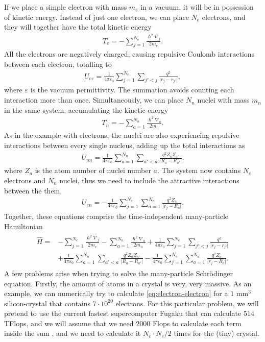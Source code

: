 If we place a simple electron with mass $m_e$ in a vacuum, it will be in  possession of kinetic energy. Instead of just one electron, we can place $N_e$ electrons, and they will together have the total kinetic energy
\begin{align}
  T_e = - \sum_{j=1}^{N_e} \frac{\hslash^2\nabla_j}{2m_e}.
\end{align}
All the electrons are negatively charged, causing repulsive Coulomb interactions between each electron, totalling to
\begin{align}
  U_{ee} = \frac{1}{4\pi\varepsilon_0}\sum_{j=1}^{N_e}\sum_{j'<j} \frac{q^2}{\lvert r_j - r_{j'}\rvert},
  \label{eq:electron-electron}
\end{align}
where $\varepsilon$ is the vacuum permittivity. The summation avoids counting each interaction more than once. Simultaneously, we can place $N_n$ nuclei with mass $m_n$ in the same system, accumulating the kinetic energy
\begin{align}
  T_n = - \sum_{a=1}^{N_n} \frac{\hslash^2\nabla_a}{2m_n}.
\end{align}
As in the example with electrons, the nuclei are also experiencing repulsive interactions between every single nucleus, adding up the total interactions as
\begin{align}
  U_{nn} = \frac{1}{4\pi\varepsilon_0}\sum_{a=1}^{N_n}\sum_{a'<a} \frac{q^2 Z_aZ_{a'}}{\lvert R_a - R_{a'}\rvert }.
\end{align}
where $Z_a$ is the atom number of nuclei number $a$. The system now contains $N_e$ electrons and $N_n$ nuclei, thus we need to include the attractive interactions between the them,
\begin{align}
  U_{en} = - \frac{1}{4\pi\varepsilon_0}\sum_{j=1}^{N_e} \sum_{a=1}^{N_n} \frac{q^2Z_a}{\lvert r_j-R_a\rvert}.
\end{align} Together, these equations comprise the time-independent many-particle Hamiltonian
\begin{align}
  \begin{aligned}
    \hat{H} = &- \sum_{j=1}^{N_e} \frac{\hslash^2\nabla_j}{2m_e}
    - \sum_{a=1}^{N_n} \frac{\hslash^2\nabla_a}{2m_n}
    + \frac{1}{4\pi\varepsilon_0} \sum_{j=1}^{N_e}\sum_{j'<j} \frac{q^2}{\lvert r_j - r_{j'}\rvert} \\
    &+\frac{1}{4\pi\varepsilon_0}\sum_{a=1}^{N_n}\sum_{a'<a} \frac{q^2 Z_aZ_{a'}}{\lvert R_a - R_{a'}\rvert } - \frac{1}{4\pi\varepsilon_0}\sum_{j=1}^{N_e} \sum_{a=1}^{N_n} \frac{q^2Z_a}{\lvert r_j-R_a\rvert}.
  \end{aligned}
\end{align} A few problems arise when trying to solve the many-particle Schrödinger equation. Firstly, the amount of atoms in a crystal is very, very massive. As an example, we can numerically try to calculate \autoref{eq:electron-electron} for a $1$ mm$^3$ silicon-crystal that contains $7\cdot 10^{20}$ electrons. For this particular problem, we will pretend to use the current fastest supercomputer Fugaku \cite{Top500} that can calculate $514$ TFlops, and we will assume that we need $2000$ Flops to calculate each term inside the sum \cite{Persson2020}, and we need to calculate it $N_e \cdot N_e/2$ times for the (tiny) crystal.
